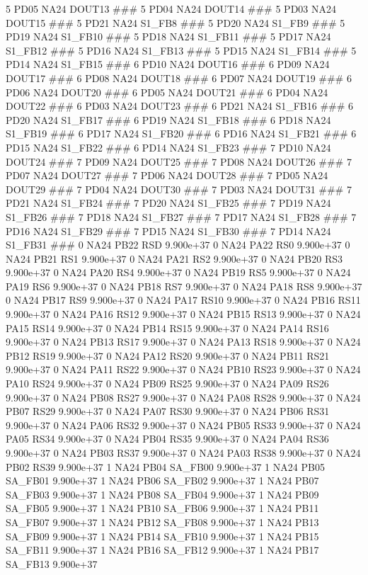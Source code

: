 5 PD05 NA24 DOUT13 ### 
5 PD04 NA24 DOUT14 ### 
5 PD03 NA24 DOUT15 ### 
5 PD21 NA24 S1_FB8 ### 
5 PD20 NA24 S1_FB9 ### 
5 PD19 NA24 S1_FB10 ### 
5 PD18 NA24 S1_FB11 ### 
5 PD17 NA24 S1_FB12 ### 
5 PD16 NA24 S1_FB13 ### 
5 PD15 NA24 S1_FB14 ### 
5 PD14 NA24 S1_FB15 ### 
6 PD10 NA24 DOUT16 ### 
6 PD09 NA24 DOUT17 ### 
6 PD08 NA24 DOUT18 ### 
6 PD07 NA24 DOUT19 ### 
6 PD06 NA24 DOUT20 ### 
6 PD05 NA24 DOUT21 ### 
6 PD04 NA24 DOUT22 ### 
6 PD03 NA24 DOUT23 ### 
6 PD21 NA24 S1_FB16 ### 
6 PD20 NA24 S1_FB17 ### 
6 PD19 NA24 S1_FB18 ### 
6 PD18 NA24 S1_FB19 ### 
6 PD17 NA24 S1_FB20 ### 
6 PD16 NA24 S1_FB21 ### 
6 PD15 NA24 S1_FB22 ### 
6 PD14 NA24 S1_FB23 ### 
7 PD10 NA24 DOUT24 ### 
7 PD09 NA24 DOUT25 ### 
7 PD08 NA24 DOUT26 ### 
7 PD07 NA24 DOUT27 ### 
7 PD06 NA24 DOUT28 ### 
7 PD05 NA24 DOUT29 ### 
7 PD04 NA24 DOUT30 ### 
7 PD03 NA24 DOUT31 ### 
7 PD21 NA24 S1_FB24 ### 
7 PD20 NA24 S1_FB25 ### 
7 PD19 NA24 S1_FB26 ### 
7 PD18 NA24 S1_FB27 ### 
7 PD17 NA24 S1_FB28 ### 
7 PD16 NA24 S1_FB29 ### 
7 PD15 NA24 S1_FB30 ### 
7 PD14 NA24 S1_FB31 ### 
0 NA24 PB22 RSD 9.900e+37 
0 NA24 PA22 RS0 9.900e+37 
0 NA24 PB21 RS1 9.900e+37 
0 NA24 PA21 RS2 9.900e+37 
0 NA24 PB20 RS3 9.900e+37 
0 NA24 PA20 RS4 9.900e+37 
0 NA24 PB19 RS5 9.900e+37 
0 NA24 PA19 RS6 9.900e+37 
0 NA24 PB18 RS7 9.900e+37 
0 NA24 PA18 RS8 9.900e+37 
0 NA24 PB17 RS9 9.900e+37 
0 NA24 PA17 RS10 9.900e+37 
0 NA24 PB16 RS11 9.900e+37 
0 NA24 PA16 RS12 9.900e+37 
0 NA24 PB15 RS13 9.900e+37 
0 NA24 PA15 RS14 9.900e+37 
0 NA24 PB14 RS15 9.900e+37 
0 NA24 PA14 RS16 9.900e+37 
0 NA24 PB13 RS17 9.900e+37 
0 NA24 PA13 RS18 9.900e+37 
0 NA24 PB12 RS19 9.900e+37 
0 NA24 PA12 RS20 9.900e+37 
0 NA24 PB11 RS21 9.900e+37 
0 NA24 PA11 RS22 9.900e+37 
0 NA24 PB10 RS23 9.900e+37 
0 NA24 PA10 RS24 9.900e+37 
0 NA24 PB09 RS25 9.900e+37 
0 NA24 PA09 RS26 9.900e+37 
0 NA24 PB08 RS27 9.900e+37 
0 NA24 PA08 RS28 9.900e+37 
0 NA24 PB07 RS29 9.900e+37 
0 NA24 PA07 RS30 9.900e+37 
0 NA24 PB06 RS31 9.900e+37 
0 NA24 PA06 RS32 9.900e+37 
0 NA24 PB05 RS33 9.900e+37 
0 NA24 PA05 RS34 9.900e+37 
0 NA24 PB04 RS35 9.900e+37 
0 NA24 PA04 RS36 9.900e+37 
0 NA24 PB03 RS37 9.900e+37 
0 NA24 PA03 RS38 9.900e+37 
0 NA24 PB02 RS39 9.900e+37 
1 NA24 PB04 SA_FB00 9.900e+37 
1 NA24 PB05 SA_FB01 9.900e+37 
1 NA24 PB06 SA_FB02 9.900e+37 
1 NA24 PB07 SA_FB03 9.900e+37 
1 NA24 PB08 SA_FB04 9.900e+37 
1 NA24 PB09 SA_FB05 9.900e+37 
1 NA24 PB10 SA_FB06 9.900e+37 
1 NA24 PB11 SA_FB07 9.900e+37 
1 NA24 PB12 SA_FB08 9.900e+37 
1 NA24 PB13 SA_FB09 9.900e+37 
1 NA24 PB14 SA_FB10 9.900e+37 
1 NA24 PB15 SA_FB11 9.900e+37 
1 NA24 PB16 SA_FB12 9.900e+37 
1 NA24 PB17 SA_FB13 9.900e+37 
